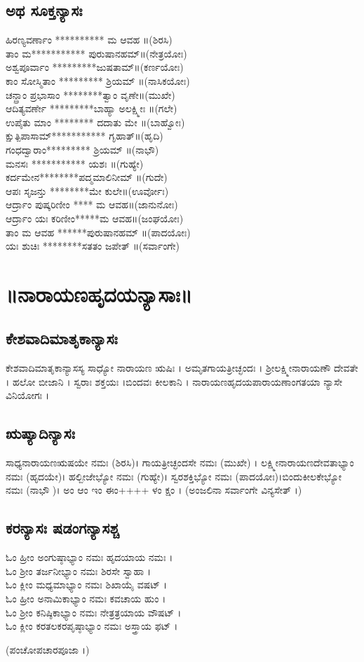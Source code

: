 \section{ಅಥ ಸೂಕ್ತನ್ಯಾಸಃ}
ಹಿರಣ್ಯವರ್ಣಾಂ ********** ಮ ಆವಹ ॥(ಶಿರಸಿ)\\
ತಾಂ ಮ*********** ಪುರುಷಾನಹಮ್॥(ನೇತ್ರಯೋಃ)\\
ಅಶ್ವಪೂರ್ವಾಂ *********ಜುಷತಾಮ್॥(ಕರ್ಣಯೋಃ)\\
ಕಾಂ ಸೋಸ್ಮಿತಾಂ ********* ಶ್ರಿಯಮ್ ॥(ನಾಸಿಕಯೋಃ)\\
ಚನ್ದ್ರಾಂ ಪ್ರಭಾಸಾಂ ********ತ್ವಾಂ ವೃಣೇ॥(ಮುಖೇ)\\
ಆದಿತ್ಯವರ್ಣೇ *********ಬಾಹ್ಯಾ ಅಲಕ್ಷ್ಮೀಃ ॥(ಗಲೇ)\\
ಉಪೈತು ಮಾಂ ******** ದದಾತು ಮೇ ॥(ಬಾಹ್ವೋಃ)\\
ಕ್ಷುತ್ಪಿಪಾಸಾಮ್*********** ಗೃಹಾತ್॥(ಹೃದಿ)\\
ಗಂಧದ್ವಾರಾಂ********* ಶ್ರಿಯಮ್ ॥(ನಾಭೌ)\\
ಮನಸಃ *********** ಯಶಃ ॥(ಗುಹ್ಯೇ)\\
ಕರ್ದಮೇನ********ಪದ್ಮಮಾಲಿನೀಮ್ ॥(ಗುದೇ)\\
ಆಪಃ ಸೃಜನ್ತು ********ಮೇ ಕುಲೇ॥(ಊರ್ವೋಃ)\\
ಆರ್ದ್ರಾಂ ಪುಷ್ಕರಿಣೀಂ **** ಮ ಆವಹ॥(ಜಾನುನೋಃ)\\
ಆರ್ದ್ರಾಂ ಯಃ ಕರಿಣೀಂ*****ಮ ಆವಹ॥(ಜಂಘಯೋಃ)\\
ತಾಂ ಮ ಆವಹ ******ಪುರುಷಾನಹಮ್ ॥(ಪಾದಯೋಃ)\\
ಯಃ ಶುಚಿಃ ********ಸತತಂ ಜಪೇತ್ ॥(ಸರ್ವಾಂಗೇ)
\chapter*{\center ॥ನಾರಾಯಣಹೃದಯನ್ಯಾಸಾಃ॥}
\section{ಕೇಶವಾದಿಮಾತೃಕಾನ್ಯಾಸಃ }
ಕೇಶವಾದಿಮಾತೃಕಾನ್ಯಾಸಸ್ಯ ಸಾಧ್ಯೋ ನಾರಾಯಣ ಋಷಿಃ । ಅಮೃತಗಾಯತ್ರೀಚ್ಛಂದಃ । ಶ್ರೀಲಕ್ಷ್ಮೀನಾರಾಯಣೌ ದೇವತೇ । ಹಲೋ ಬೀಜಾನಿ । ಸ್ವರಾಃ ಶಕ್ತಯಃ ।ಬಿಂದವಃ ಕೀಲಕಾನಿ । ನಾರಾಯಣಹೃದಯಪಾರಾಯಣಾಂಗತಯಾ ನ್ಯಾಸೇ ವಿನಿಯೋಗಃ ।
 \section{ಋಷ್ಯಾದಿನ್ಯಾಸಃ }
ಸಾಧ್ಯನಾರಾಯಣಋಷಯೇ ನಮಃ (ಶಿರಸಿ)। ಗಾಯತ್ರೀಚ್ಛಂದಸೇ ನಮಃ (ಮುಖೇ) । ಲಕ್ಷ್ಮೀನಾರಾಯಣದೇವತಾಭ್ಯಾಂ ನಮಃ (ಹೃದಯೇ)। ಹಲ್ಬೀಜೇಭ್ಯೋ ನಮಃ (ಗುಹ್ಯೇ)। ಸ್ವರಶಕ್ತಿಭ್ಯೋ ನಮಃ (ಪಾದಯೋಃ)।ಬಿಂದುಕೀಲಕೇಭ್ಯೋ ನಮಃ (ನಾಭೌ )।
ಅಂ ಆಂ ಇಂ ಈಂ++++ ಳಂ ಕ್ಷಂ । (ಅಂಜಲಿನಾ ಸರ್ವಾಂಗೇ ವಿನ್ಯಸೇತ್ ।)
\section{ಕರನ್ಯಾಸಃ ಷಡಂಗನ್ಯಾಸಶ್ಚ }
ಓಂ ಹ್ರೀಂ ಅಂಗುಷ್ಠಾಭ್ಯಾಂ ನಮಃ ಹೃದಯಾಯ ನಮಃ ।\\
ಓಂ ಶ್ರೀಂ ತರ್ಜನೀಭ್ಯಾಂ ನಮಃ ಶಿರಸೇ ಸ್ವಾಹಾ ।\\
ಓಂ ಕ್ಲೀಂ ಮಧ್ಯಮಾಭ್ಯಾಂ ನಮಃ ಶಿಖಾಯೈ ವಷಟ್ ।\\
ಓಂ ಹ್ರೀಂ ಅನಾಮಿಕಾಭ್ಯಾಂ ನಮಃ ಕವಚಾಯ ಹುಂ ।\\
ಓಂ ಶ್ರೀಂ ಕನಿಷ್ಠಿಕಾಭ್ಯಾಂ ನಮಃ ನೇತ್ರತ್ರಯಾಯ ವೌಷಟ್ ।\\
ಓಂ ಕ್ಲೀಂ ಕರತಲಕರಪೃಷ್ಠಾಭ್ಯಾಂ ನಮಃ ಅಸ್ತ್ರಾಯ ಫಟ್ ।
\begin{center}

(ಪಂಚೋಪಚಾರಪೂಜಾ ।)\end{center}
\newpage

